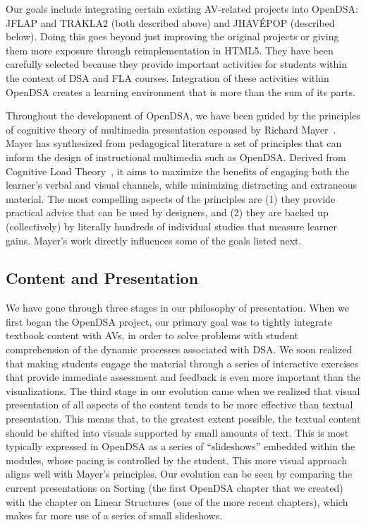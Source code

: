 \documentclass[11pt]{article}
\begin{document}
Our goals include integrating certain existing AV-related projects
into OpenDSA: JFLAP and TRAKLA2 (both described above) and
JHAV\'{E}POP (described below).
Doing this goes beyond just improving the original projects or giving
them more exposure through reimplementation in HTML5.
They have been carefully selected because they provide important
activities for students within the context of DSA and FLA courses.
Integration of these activities within OpenDSA creates a learning
environment that is more than the sum of its parts.

Throughout the development of OpenDSA, we have been guided by the
principles of cognitive theory of multimedia presentation espoused
by Richard Mayer~\cite{Mayer02,Mayer08}.
Mayer has synthesized from pedagogical literature a set of principles
that can inform the design of instructional multimedia such as
OpenDSA.
Derived from Cognitive Load Theory~\cite{Sweller1999}, it aims to
maximize the benefits of engaging both the learner's verbal and visual
channels, while minimizing distracting and extraneous material.
The most compelling aspects of the principles are
(1) they provide practical advice that can be used by designers, and
(2) they are backed up (collectively) by literally hundreds
of individual studies that measure learner gains.
Mayer's work directly influences some of the goals listed next.

\subsection {Content and Presentation}

We have gone through three stages in our philosophy of presentation.
When we first began the OpenDSA project, our primary goal was to
tightly integrate textbook content with AVs, in order to solve
problems with student comprehension of the dynamic processes
associated with DSA.
We soon realized that making students engage the material through a
series of interactive exercises that provide immediate assessment and
feedback is even more important than the visualizations.
The third stage in our evolution came when we realized that visual
presentation of all aspects of the content tends to be more effective
than textual presentation.
This means that, to the greatest extent possible, the textual content
should be shifted into visuals supported by small amounts of text.
This is most typically expressed in OpenDSA as a series of
``slideshows'' embedded within the modules, whose pacing is controlled
by the student.
This more visual approach aligns well with Mayer's principles.
Our evolution can be seen by comparing the current presentations on
Sorting (the first OpenDSA chapter that we created) with the chapter
on Linear Structures (one of the more recent chapters), which makes
far more use of a series of small slideshows.
\end{document}
